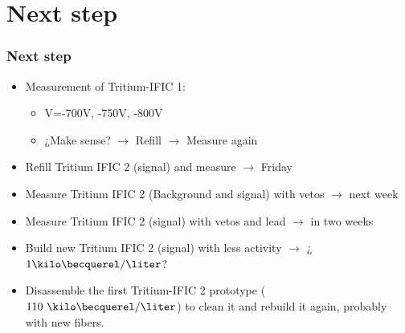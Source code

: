 \documentclass{beamer}
\begin{document}
\section{Next step}
\begin{frame}
\frametitle{Next step}

\begin{itemize}
\item{} Measurement of Tritium-IFIC 1:

	\begin{itemize}
	\item{} V=-700V, -750V, -800V 
	\item{} ¿Make sense? $\rightarrow$ Refill $\rightarrow$ Measure again
	\end{itemize}
	
\item{} Refill Tritium IFIC 2 (signal) and measure $\rightarrow$ Friday
\item{} Measure Tritium IFIC 2 (Background and signal) with vetos $\rightarrow$ next week
\item{} Measure Tritium IFIC 2 (signal) with vetos and lead $\rightarrow$ in two weeks
\item{} Build new Tritium IFIC 2 (signal) with less activity $\rightarrow$ ¿$1\kilo\becquerel/\liter$?
\item{} Disassemble the first Tritium-IFIC 2 prototype ($110~\kilo\becquerel/\liter$) to clean it and rebuild it again, probably with new fibers.
\end{itemize}

\end{frame}
\end{document}
